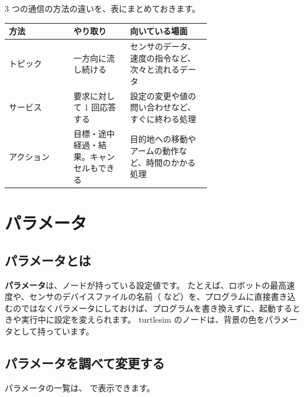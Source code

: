 3 つの通信の方法の違いを、表にまとめておきます。

\begin{tablebox}
  \begin{tabular}{lp{0.28\linewidth}p{0.4\linewidth}}
    \toprule
    方法 & やり取り & 向いている場面 \\
    \midrule
    トピック & 一方向に流し続ける & センサのデータ、速度の指令など、次々と流れるデータ \\
    サービス & 要求に対して 1 回応答する & 設定の変更や値の問い合わせなど、すぐに終わる処理 \\
    アクション & 目標・途中経過・結果。キャンセルもできる & 目的地への移動やアームの動作など、時間のかかる処理 \\
    \bottomrule
  \end{tabular}
\end{tablebox}

\section{パラメータ}
\label{sec:ros2-concepts-param}

\subsection{パラメータとは}

\textbf{パラメータ}は、ノードが持っている設定値です。
たとえば、ロボットの最高速度や、センサのデバイスファイルの名前（ など）を、プログラムに直接書き込むのではなくパラメータにしておけば、プログラムを書き換えずに、起動するときや実行中に設定を変えられます。
turtlesim のノードは、背景の色をパラメータとして持っています。

\subsection{パラメータを調べて変更する}

パラメータの一覧は、 で表示できます。


